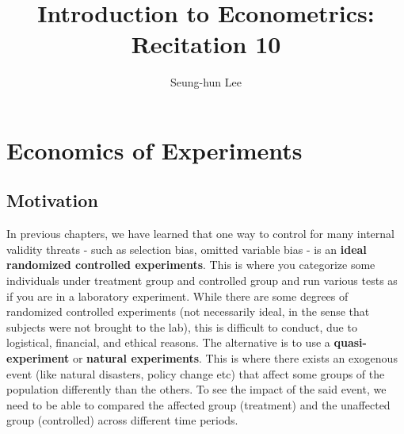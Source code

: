 \documentclass[12pt]{article}
\title{\Large{Introduction to Econometrics: Recitation 10}}
\theoremstyle{definition}
\theoremstyle{property}
\theoremstyle{assumption}
\theoremstyle{example}
\theoremstyle{comment}
\begin{document}
\linespread{1.25}
\author{Seung-hun Lee}
\date{}
\maketitle
\section{Economics of Experiments}
\subsection{Motivation}
In previous chapters, we have learned that one way to control for many internal validity threats - such as selection bias, omitted variable bias - is an \textbf{ideal randomized controlled experiments}. This is where you categorize some individuals under treatment group and controlled group and run various tests as if you are in a laboratory experiment. While there are some degrees of randomized controlled experiments (not necessarily ideal, in the sense that subjects were not brought to the lab), this is difficult to conduct, due to logistical, financial, and ethical reasons. The alternative is to use a \textbf{quasi-experiment} or \textbf{natural experiments}. This is where there exists an exogenous event (like natural disasters, policy change etc) that affect some groups of the population differently than the others.  To see the impact of the said event, we need to be able to compared the affected group (treatment) and the unaffected group (controlled) across different time periods. \par\medskip
\end{document}
